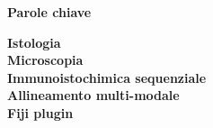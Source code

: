 
\clearemptydoublepage{}
\thispagestyle{empty}
\vspace*{20ex}
\begin{flushright}
    \begin{LARGE}
        \textbf{Parole chiave}\\
        \vspace{5ex}
    \end{LARGE}
    \begin{normalsize}
        \textbf{%
            Istologia\\%
            \medskip
            Microscopia\\%
            \medskip
            Immunoistochimica sequenziale\\%
            \medskip
            Allineamento multi-modale\\%
            \medskip
            Fiji plugin%
        }
    \end{normalsize}
\end{flushright}
\vfill
